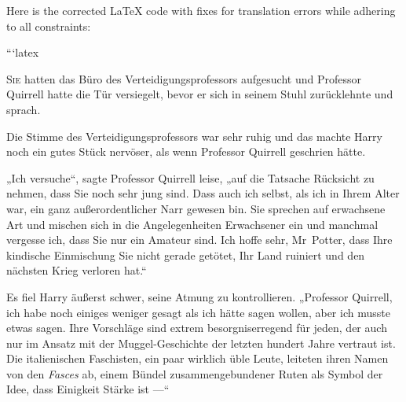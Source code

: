 Here is the corrected LaTeX code with fixes for translation errors while adhering to all constraints:

```latex

\lettrine{S}{ie} hatten das Büro des Verteidigungsprofessors aufgesucht und Professor Quirrell hatte die Tür versiegelt, bevor er sich in seinem Stuhl zurücklehnte und sprach.

Die Stimme des Verteidigungsprofessors war sehr ruhig und das machte Harry noch ein gutes Stück nervöser, als wenn Professor Quirrell geschrien hätte.

„Ich versuche“, sagte Professor Quirrell leise, „auf die Tatsache Rücksicht zu nehmen, dass Sie noch sehr jung sind. Dass auch ich selbst, als ich in Ihrem Alter war, ein ganz außerordentlicher Narr gewesen bin. Sie sprechen auf erwachsene Art und mischen sich in die Angelegenheiten Erwachsener ein und manchmal vergesse ich, dass Sie nur ein Amateur sind. Ich hoffe sehr, Mr~Potter, dass Ihre kindische Einmischung Sie nicht gerade getötet, Ihr Land ruiniert und den nächsten Krieg verloren hat.“

Es fiel Harry äußerst schwer, seine Atmung zu kontrollieren.
„Professor Quirrell, ich habe noch einiges weniger gesagt als ich hätte sagen wollen, aber ich musste etwas sagen. Ihre Vorschläge sind extrem besorgniserregend für jeden, der auch nur im Ansatz mit der Muggel-Geschichte der letzten hundert Jahre vertraut ist. Die italienischen Faschisten, ein paar wirklich üble Leute, leiteten ihren Namen von den \emph{Fasces} ab, einem Bündel zusammengebundener Ruten als Symbol der Idee, dass Einigkeit Stärke ist —“

